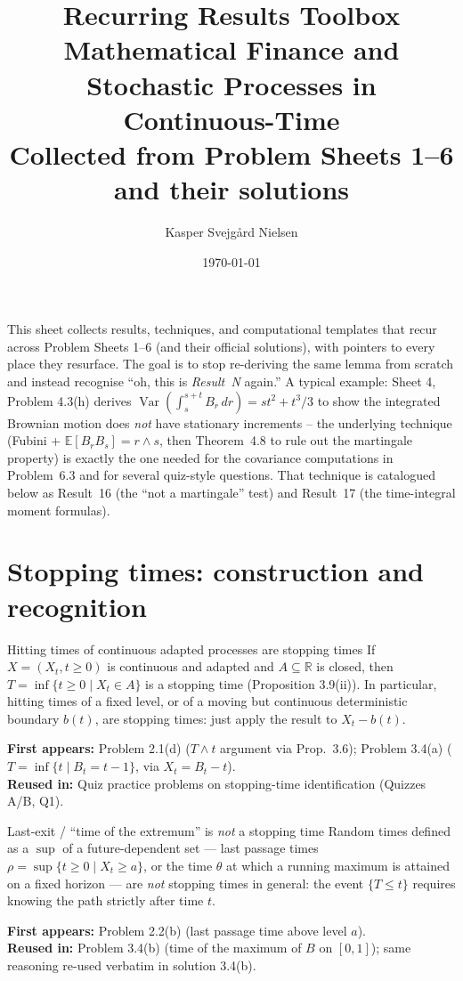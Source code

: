\documentclass[11pt]{article}
\title{Recurring Results Toolbox\\[2pt]\large Mathematical Finance and Stochastic Processes in Continuous-Time\\ Collected from Problem Sheets 1--6 and their solutions}
\author{Kasper Svejgård Nielsen}
\date{\today}
\newcommand{\R}{\mathbb{R}}
\newcommand{\E}{\mathbb{E}}
\DeclareMathOperator{\Var}{Var}
\newcommand{\used}[2]{\begin{sourcebox}\textbf{First appears:} #1 \\ \textbf{Reused in:} #2\end{sourcebox}}
\begin{document}
\maketitle
\thispagestyle{fancy}

\noindent This sheet collects results, techniques, and computational templates that
recur across Problem Sheets 1--6 (and their official solutions), with pointers to
every place they resurface. The goal is to stop re-deriving the same lemma from
scratch and instead recognise ``oh, this is \emph{Result~N} again.'' A typical
example: Sheet 4, Problem 4.3(h) derives $\Var(\int_s^{s+t}B_r\,dr)=st^2+t^3/3$ to
show the integrated Brownian motion does \emph{not} have stationary increments --
the underlying technique (Fubini + $\E[B_rB_s]=r\wedge s$, then Theorem~4.8 to rule
out the martingale property) is exactly the one needed for the covariance
computations in Problem~6.3 and for several quiz-style questions. That technique is
catalogued below as Result~16 (the ``not a martingale'' test) and
Result~17 (the time-integral moment formulas).

\tableofcontents

\section{Stopping times: construction and recognition}

\begin{result}{Hitting times of continuous adapted processes are stopping times}
\label{res:1}
If $X=(X_t,t\ge0)$ is continuous and adapted and $A\subseteq\R$ is closed, then
$T=\inf\{t\ge0\mid X_t\in A\}$ is a stopping time (Proposition 3.9(ii)). In
particular, hitting times of a fixed level, or of a moving but continuous
deterministic boundary $b(t)$, are stopping times: just apply the result to
$X_t - b(t)$.
\end{result}
\used{Problem 2.1(d) ($T\wedge t$ argument via Prop.\ 3.6); Problem 3.4(a)
($T=\inf\{t\mid B_t=t-1\}$, via $X_t=B_t-t$).}{Quiz practice problems on
stopping-time identification (Quizzes A/B, Q1).}

\begin{result}{Last-exit / ``time of the extremum'' is \emph{not} a stopping time}
\label{res:2}
Random times defined as a $\sup$ of a future-dependent set --- last passage times
$\rho=\sup\{t\ge0\mid X_t\ge a\}$, or the time $\theta$ at which a running maximum
is attained on a fixed horizon --- are \emph{not} stopping times in general: the
event $\{T\le t\}$ requires knowing the path strictly after time $t$.
\end{result}
\used{Problem 2.2(b) (last passage time above level $a$).}{Problem 3.4(b) (time of
the maximum of $B$ on $[0,1]$); same reasoning re-used verbatim in solution 3.4(b).}
\end{document}

